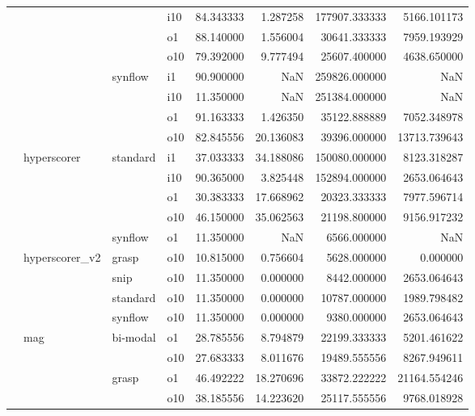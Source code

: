 \begin{longtable}{llllrrrr}
      &     &         & i10 &  84.343333 &   1.287258 &    177907.333333 &   5166.101173 \\
      &     &         & o1 &  88.140000 &   1.556004 &     30641.333333 &   7959.193929 \\
      &     &         & o10 &  79.392000 &   9.777494 &     25607.400000 &   4638.650000 \\
      &     & synflow & i1 &  90.900000 &        NaN &    259826.000000 &           NaN \\
      &     &         & i10 &  11.350000 &        NaN &    251384.000000 &           NaN \\
      &     &         & o1 &  91.163333 &   1.426350 &     35122.888889 &   7052.348978 \\
      &     &         & o10 &  82.845556 &  20.136083 &     39396.000000 &  13713.739643 \\
      & hyperscorer & standard & i1 &  37.033333 &  34.188086 &    150080.000000 &   8123.318287 \\
      &     &         & i10 &  90.365000 &   3.825448 &    152894.000000 &   2653.064643 \\
      &     &         & o1 &  30.383333 &  17.668962 &     20323.333333 &   7977.596714 \\
      &     &         & o10 &  46.150000 &  35.062563 &     21198.800000 &   9156.917232 \\
      &     & synflow & o1 &  11.350000 &        NaN &      6566.000000 &           NaN \\
      & hyperscorer\_v2 & grasp & o10 &  10.815000 &   0.756604 &      5628.000000 &      0.000000 \\
      &     & snip & o10 &  11.350000 &   0.000000 &      8442.000000 &   2653.064643 \\
      &     & standard & o10 &  11.350000 &   0.000000 &     10787.000000 &   1989.798482 \\
      &     & synflow & o10 &  11.350000 &   0.000000 &      9380.000000 &   2653.064643 \\
      & mag & bi-modal & o1 &  28.785556 &   8.794879 &     22199.333333 &   5201.461622 \\
      &     &         & o10 &  27.683333 &   8.011676 &     19489.555556 &   8267.949611 \\
      &     & grasp & o1 &  46.492222 &  18.270696 &     33872.222222 &  21164.554246 \\
      &     &         & o10 &  38.185556 &  14.223620 &     25117.555556 &   9768.018928 \\

\end{longtable}
